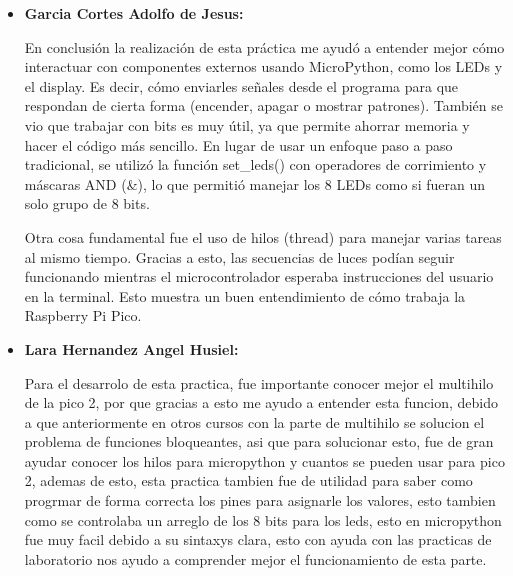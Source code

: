 \documentclass[letterpaper,12pt]{article}
\begin{document}
\begin{itemize}
        En la interfaz de terminal, se utilizaron arreglos para validar entradas y un menú estructurado. Para el Zig-Zag, se optimizó el código usando una lista de posiciones y la operación \texttt{1 << posicion}, evitando definir 15 valores explícitos y físicamente, se construyó el circuito con una barra de LEDs para facilitar la implementación y resistencias de 68 $\Omega$, validando las ocho secuencias implementadas.


        \item \textbf{Garcia Cortes Adolfo de Jesus:}

        En conclusión la realización de esta práctica me ayudó a entender mejor cómo interactuar con componentes externos usando MicroPython, como los LEDs y el display. Es decir, cómo enviarles señales desde el programa para que respondan de cierta forma (encender, apagar o mostrar patrones). También se vio que trabajar con bits es muy útil, ya que permite ahorrar memoria y hacer el código más sencillo. En lugar de usar un enfoque paso a paso tradicional, se utilizó la función set\_leds() con operadores de corrimiento y máscaras AND (\&), lo que permitió manejar los 8 LEDs como si fueran un solo grupo de 8 bits.

        Otra cosa fundamental fue el uso de hilos (thread) para manejar varias tareas al mismo tiempo. Gracias a esto, las secuencias de luces podían seguir funcionando mientras el microcontrolador esperaba instrucciones del usuario en la terminal. Esto muestra un buen entendimiento de cómo trabaja la Raspberry Pi Pico. 
        
        \item \textbf{Lara Hernandez Angel Husiel:}
        
        Para el desarrolo de esta practica, fue importante conocer mejor el multihilo de la pico 2, por que gracias a esto me ayudo a entender esta funcion, debido a que anteriormente en otros cursos con la parte de multihilo se solucion el problema de funciones bloqueantes, asi que para solucionar esto, fue de gran ayudar conocer los hilos para micropython y cuantos se pueden usar para pico 2, ademas de esto, esta practica tambien fue de utilidad para saber como progrmar de forma correcta los pines para asignarle los valores, esto tambien como se controlaba un arreglo de los 8 bits para los leds, esto en micropython fue muy facil debido a su sintaxys clara, esto con ayuda con las practicas de laboratorio nos ayudo a comprender mejor el funcionamiento de esta parte.
        

\end{itemize}
\end{document}
